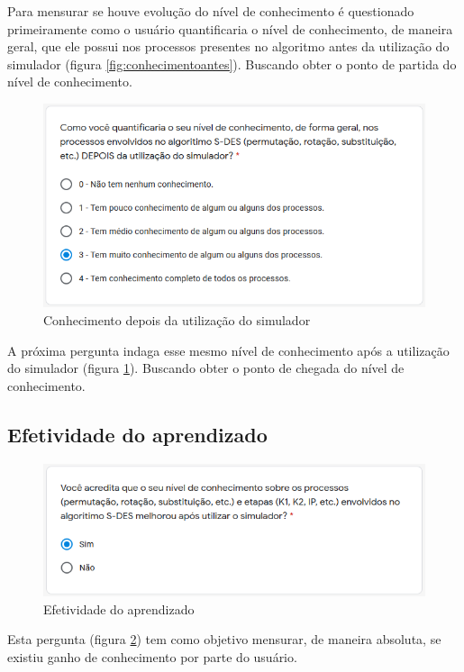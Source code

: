 Para mensurar se houve evolução do nível de conhecimento é questionado primeiramente como o usuário quantificaria o nível de conhecimento, de maneira geral, que ele possui nos processos presentes no algoritmo antes da utilização do simulador (figura \ref{fig:conhecimentoantes}). Buscando obter o ponto de partida do nível de conhecimento.

\begin{figure}[H]
    \centering
    \caption{Conhecimento depois da utilização do simulador}
    \label{fig:conhecimentodepois}
    \includegraphics[width=0.75\linewidth]{Questionario/Q3.png}
\end{figure}

A próxima pergunta indaga esse mesmo nível de conhecimento após a utilização do simulador (figura \ref{fig:conhecimentodepois}). Buscando obter o ponto de chegada do nível de conhecimento.

\subsection{Efetividade do aprendizado}

\begin{figure}[H]
    \centering
    \caption{Efetividade do aprendizado}
    \label{fig:efetividadeaprendizado}
    \includegraphics[width=0.75\linewidth]{Questionario/Q4.png}
\end{figure}

Esta pergunta (figura \ref{fig:efetividadeaprendizado}) tem como objetivo mensurar, de maneira absoluta, se existiu ganho de conhecimento por parte do usuário.

